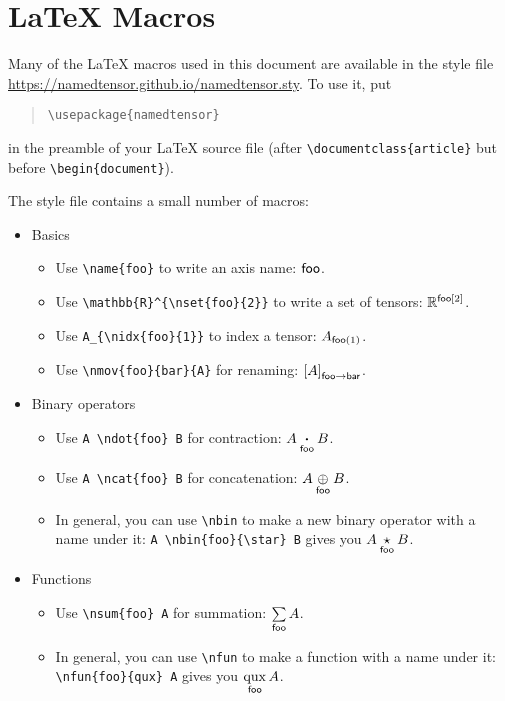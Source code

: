 \documentclass{article}
\begin{document}
\section{\LaTeX{} Macros}

Many of the \LaTeX{} macros used in this document are available in the style file \url{https://namedtensor.github.io/namedtensor.sty}. To use it, put
\begin{quote}
\begin{verbatim}
\usepackage{namedtensor}
\end{verbatim}
\end{quote}
in the preamble of your \LaTeX{} source file (after \verb|\documentclass{article}| but before \verb|\begin{document}|).

The style file contains a small number of macros:
\begin{itemize}
\item Basics
  \begin{itemize}
  \item Use \verb|\name{foo}| to write an axis name: $\name{foo}$.
  \item Use \verb|\mathbb{R}^{\nset{foo}{2}}| to write a set of tensors: $\mathbb{R}^{\nset{foo}{2}}$.
  \item Use \verb|A_{\nidx{foo}{1}}| to index a tensor: $A_{\nidx{foo}{1}}$.
  \item Use \verb|\nmov{foo}{bar}{A}| for renaming: $\nmov{foo}{bar}{A}$.
  \end{itemize}
\item Binary operators
  \begin{itemize}
  \item Use \verb|A \ndot{foo} B| for contraction: $A \ndot{foo} B$.
  \item Use \verb|A \ncat{foo} B| for concatenation: $A \ncat{foo} B$.
  \item In general, you can use \verb|\nbin| to make a new binary operator with a name under it: \verb|A \nbin{foo}{\star} B| gives you $A \nbin{foo}{\star} B$.
  \end{itemize}
\item Functions
  \begin{itemize}
  \item Use \verb|\nsum{foo} A| for summation: $\nsum{foo} A$.
  \item In general, you can use \verb|\nfun| to make a function with a name under it: \verb|\nfun{foo}{qux} A| gives you $\nfun{foo}{qux} A$.
  \end{itemize}
\end{itemize}
\end{document}
